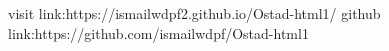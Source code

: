 visit link:https://ismailwdpf2.github.io/Ostad-html1/
github link:https://github.com/ismailwdpf/Ostad-html1
